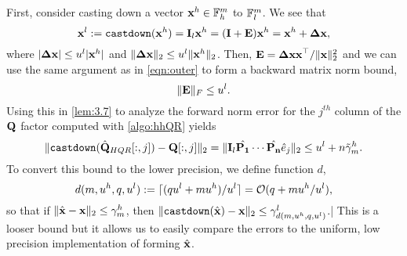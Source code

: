 First, consider casting down a vector $\mathbf{x}^h\in\mathbb{F}_h^m$ to $\mathbb{F}_l^m$.
We see that
\begin{equation}
	\mathbf{x}^l := \text{\tt castdown}(\mathbf{x}^h) = \mathbf{I}_{l}\mathbf{x}^h = (\mathbf{I}+\mathbf{E})\mathbf{x}^h = \mathbf{x}^h+\mathbf{\Delta x},
\end{equation}
where $|\mathbf{\Delta x}| \leq u^l |\mathbf{x}^h|$ and  $\|\mathbf{\Delta x}\|_2 \leq u^l \|\mathbf{x}^h\|_2$.
Then, $\mathbf{E} = \mathbf{\Delta x x}^{\top}/\|\mathbf{x}\|_2^2$ and we can use the same argument as in \cref{eqn:outer} to form a backward matrix norm bound, 
\begin{equation}
	\|\bb{E}\|_F\leq u^l. \label{eqn:castdown}
\end{equation}
Using this in \cref{lem:3.7} to analyze the forward norm error for the $j^{th}$ column of the $\mathbf{Q}$ factor computed with \cref{algo:hhQR} yields
\begin{equation}
	\|\text{\tt castdown}(\hat{\bb{Q}}_{HQR}[:,j]) - \bb{Q}[:,j]\|_2 = \|\bb{I}_l\hat{\bb{P_1}}\cdots\hat{\bb{P_n}}\hat{e}_j\|_2 \leq u^l+n\tilde{\gamma}_m^h.\label{eqn:HQR-mp}
\end{equation}
To convert this bound to the lower precision, we define function $d$,
\begin{equation}
d(m,u^h, q,u^l) := \lceil (qu^l+mu^h)/u^l\rceil = \cO(q+mu^h/u^l),\label{eqn:d}
\end{equation} 
so that if $\|\hat{\mathbf{x}}-\mathbf{x}\|_2 \leq \gamma_m^h$, then $\|\text{\tt castdown}(\hat{\mathbf{x}})-\mathbf{x}\|_2 \leq \gamma_{d(m,u^h, q,u^l)}^l$.|
This is a looser bound but it allows us to easily compare the errors to the uniform, low precision implementation of forming $\hat{\mathbf{x}}$.
